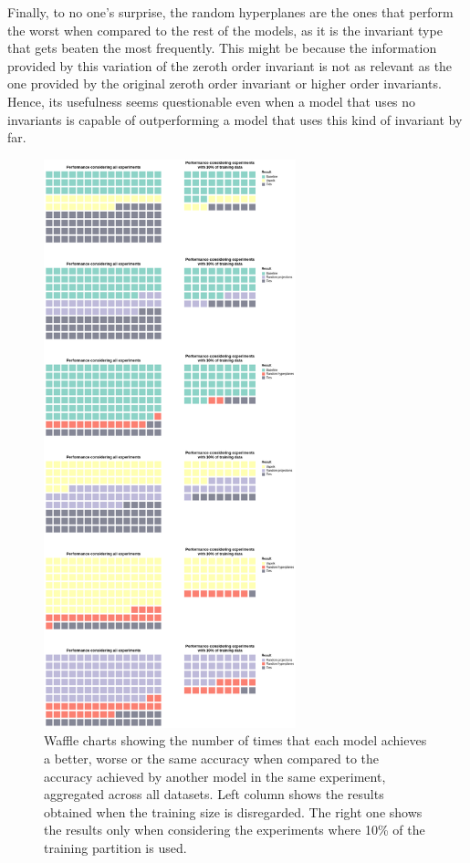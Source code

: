 Finally, to no one's surprise, the random hyperplanes are the ones that perform the worst when compared to the
rest of the models, as it is the invariant type that gets beaten the most frequently. This might be because the
information provided by this variation of the zeroth order invariant is not as relevant as the one provided by
the original zeroth order invariant or higher order invariants. Hence, its usefulness seems questionable even
when a model that uses no invariants is capable of outperforming a model that uses this kind
of invariant by far.

\begin{figure}[ht]
    \centering
    \includegraphics[width=0.65\textwidth]{thesis/Figures/invariants_performance.png}
    \caption{Waffle charts showing the number of times that each model achieves a better, worse or the same
    accuracy when compared to the accuracy achieved by another model in the same experiment, aggregated
    across all datasets. Left column shows the results obtained when the training size is disregarded.
    The right one shows the results only when considering the experiments where 10\% of the training partition
    is used.}
    \label{fig:invariants_performance}
\end{figure}